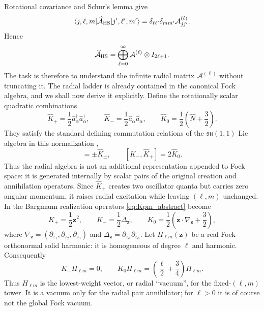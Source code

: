 \documentclass[11pt]{article}
\numberwithin{equation}{section}
\theoremstyle{definition}
\begin{document}
Rotational covariance and Schur's lemma \cite{Hall2015} give
\begin{equation}
 \langle j,\ell,m|
 \widehat{\mathcal A}_{\rm HS}
 |j',\ell',m'\rangle
 =
 \delta_{\ell\ell'}\delta_{mm'}
 \mathcal A^{(\ell)}_{jj'}.
 \label{eq:block}
\end{equation}
Hence
\begin{equation}
 \widehat{\mathcal A}_{\rm HS}
 =
 \bigoplus_{\ell=0}^\infty
 \mathcal A^{(\ell)}\otimes I_{2\ell+1}.
 \label{eq:blocksum}
\end{equation}
The task is therefore to understand the infinite radial matrix
$\mathcal A^{(\ell)}$ without truncating it.
The radial ladder is already contained in the canonical Fock algebra, and we shall now derive it explicitly.  Define
the rotationally scalar quadratic combinations
\begin{equation}
 \widehat K_+
 =\frac12\hat a_\alpha^\dagger\hat a_\alpha^\dagger,
 \qquad
 \widehat K_-
 =\frac12\hat a_\alpha\hat a_\alpha,
 \qquad
 \widehat K_0
 =\frac12\left(\widehat N+\frac32\right).
 \label{eq:Kpm_abstract}
\end{equation}
They satisfy the standard defining commutation relations of the
$\mathfrak{su}(1,1)$ Lie algebra in this normalization \cite{Perelomov1986},
\begin{equation}
 [\widehat K_0,\widehat K_\pm]=\pm\widehat K_\pm,
 \qquad
 [\widehat K_-,\widehat K_+]=2\widehat K_0.
 \label{eq:su11_commutators}
\end{equation}
Thus the radial algebra is not an additional representation appended to Fock
space: it is generated internally by scalar pairs of the original creation
and annihilation operators.  Since $\widehat K_+$ creates two oscillator
quanta but carries zero angular momentum, it raises radial excitation while
leaving $(\ell,m)$ unchanged.
In the Bargmann realization operators \eqref{eq:Kpm_abstract} become
\begin{equation}
 K_+=\frac12\bm z^2,
 \qquad
 K_-=\frac12\Delta_{\bm z},
 \qquad
 K_0=\frac12\left(
 \bm z\cdot\nabla_{\bm z}+\frac32
 \right),
 \label{eq:Kpm}
\end{equation}
where
$\nabla_{\bm z}=(\partial_{z_1},\partial_{z_2},\partial_{z_3})$ and
$\Delta_{\bm z}=\partial_{z_\alpha}\partial_{z_\alpha}$.
Let $H_{\ell m}(\bm z)$ be a real Fock-orthonormal solid harmonic: it is
homogeneous of degree $\ell$ and harmonic.  Consequently
\begin{equation}
 K_-H_{\ell m}=0,
 \qquad
 K_0H_{\ell m}
 =\left(\frac\ell2+\frac34\right)H_{\ell m}.
 \label{eq:harmonic_lowest_weight}
\end{equation}
Thus $H_{\ell m}$ is the lowest-weight vector, or radial ``vacuum'', for the
fixed-$(\ell,m)$ tower.  It is a vacuum only for the radial pair annihilator;
for $\ell>0$ it is of course not the global Fock vacuum.
\end{document}
